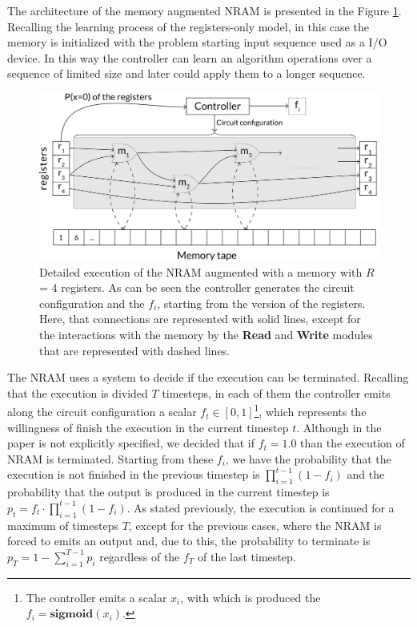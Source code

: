 The architecture of the memory augmented NRAM is presented in the Figure \ref{fig:memory-nram}. Recalling the learning process of the registers-only model, in this case the memory is initialized with the problem starting input sequence used as a I/O device. In this way the controller can learn an algorithm operations over a sequence of limited size and later could apply them to a longer sequence.\newline\newline
\begin{figure}[t!]
	\centering
	\includegraphics[width=\textwidth]{figures/memory-augmented-model.png}
	\caption{Detailed execution of the NRAM augmented with a memory with $R$ = 4 registers. As can be seen the controller generates the circuit configuration and the $f_i$, starting from the  version of the registers. Here, that connections are represented with solid lines, except for the interactions with the memory by the \textbf{Read} and \textbf{Write} modules that are represented with dashed lines.}
	\label{fig:memory-nram}
\end{figure}
The NRAM uses a system to decide if the execution can be terminated. Recalling that the execution is divided $T$ timesteps, in each of them the controller emits along the circuit configuration a scalar $f_{t} \in [0, 1]$\footnote{The controller emits a scalar $x_{i}$, with which is produced the $f_i = \textbf{sigmoid}(x_{i})$.}, which represents the willingness of finish the execution in the current timestep $t$. Although in the paper is not explicitly specified, we decided that if $f_{t} = 1.0$ than the execution of NRAM is terminated. Starting from these $f_i$, we have the probability that the execution is not finished in the previous timestep is $\prod\limits_{i=1}^{t-1}(1 - f_{i})$ and the probability that the output is produced in the current timestep is $p_{t} = f_{t} \cdot \prod\limits_{i=1}^{t-1}(1 - f_{i})$. As stated previously, the execution is continued for a maximum of timesteps $T$, except for the previous cases, where the NRAM is forced to emits an output and, due to this, the probability to terminate is $p_{T} = 1 - \sum\limits_{i=1}^{T-1}p_{i}$ regardless of the $f_{T}$ of the last timestep. 

